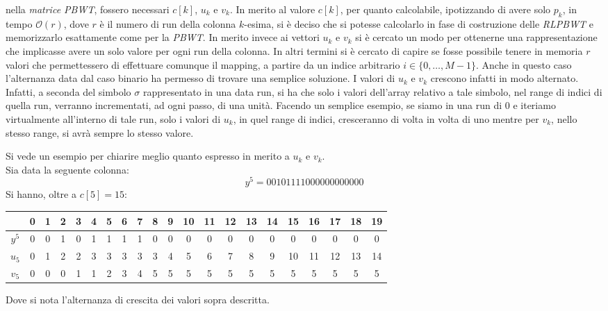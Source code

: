 nella \textit{matrice PBWT}, fossero necessari $c[k]$, $u_k$ e $v_k$. In merito
al valore $c[k]$, per quanto calcolabile, ipotizzando di avere solo $p_k$, in
tempo $\mathcal{O}(r)$, dove $r$ è 
il numero di run della colonna $k$-esima, si è deciso che si potesse calcolarlo
in fase di costruzione delle \textit{RLPBWT} e memorizzarlo esattamente come per
la \textit{PBWT}. In merito invece ai vettori $u_k$ e $v_k$ si è cercato un modo
per ottenerne una rappresentazione che implicasse avere un solo valore per ogni
run della colonna. In altri termini si è cercato di capire se fosse possibile
tenere in memoria $r$ valori che permettessero di effettuare comunque il
mapping, a partire da un indice arbitrario $i\in\{0,\ldots,M-1\}$. Anche in
questo caso l'alternanza data dal caso binario ha permesso di trovare una
semplice soluzione. I valori di $u_k$ e $v_k$ crescono infatti in modo
alternato. Infatti, a seconda del simbolo $\sigma$ rappresentato in una data
run, si ha che solo i valori dell'array relativo a tale simbolo, nel range di
indici di quella run, verranno incrementati, ad ogni passo, di una
unità. Facendo un semplice esempio, se siamo in una run di 0 e iteriamo
virtualmente all'interno di tale run, solo i valori di $u_k$, in quel
range di indici, cresceranno di volta in volta di uno mentre per $v_k$, nello
stesso range, si avrà sempre lo stesso valore.
\begin{esempio}
  Si vede un esempio per chiarire meglio quanto espresso in merito a $u_k$ e
  $v_k$.\\
  Sia data la seguente colonna:
  \[y^5=00101111000000000000\]
  Si hanno, oltre a $c[5]=15$:
  \begin{table}[H]
    \footnotesize
    \centering
    \begin{tabular}{c||cc|c|c|cccc|cccccccccccc}
      & 0 & 1 & 2 & 3 & 4 & 5 & 6 & 7 & 8 & 9 & 10 & 11 & 12 & 13 & 14 & 15 & 16
      & 17 & 18 & 19\\
      \hline
      \hline
      $y^5$ & 0 & 0 & 1 & 0 & 1 & 1 & 1 & 1 & 0 & 0 & 0 & 0 & 0 & 0 & 0 & 0 & 0
      & 0 & 0 & 0\\
      \hline
      \hline
      $u_5$ & 0 & 1 & 2 & 2 & 3 & 3 & 3 & 3 & 3 & 4 & 5 & 6 & 7 & 8 & 9 & 10
      & 11 & 12 & 13 & 14\\
      \hline
      $v_5$ & 0 & 0 & 0 & 1 & 1 & 2 & 3 & 4 & 5 & 5 & 5 & 5 & 5 & 5 & 5 & 5 & 5
      & 5 & 5 & 5
    \end{tabular}
  \end{table}
  Dove si nota l'alternanza di crescita dei valori sopra descritta.
\end{esempio}
